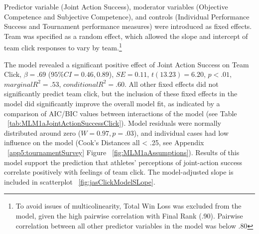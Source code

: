 \bigskip

Predictor variable (Joint Action Success), moderator variables (Objective Competence and Subjective Competence), and controls (Individual Performance Success and Tournament performance measures) were introduced as fixed effects.   Team was specified as a random effect, which allowed the slope and intercept of team click responses to vary by team.\footnote{To avoid issues of multicolinearity, Total Win Loss was excluded from the model, given the high pairwise correlation with Final Rank (.90). Pairwise correlation between all other predictor variables in the model was below .80}

The model revealed a significant positive effect of Joint Action Success on Team Click, $\beta = .69$ ($95\% CI =  0.46, 0.89$), $SE = 0.11$, $t(13.23) = 6.20$, $p < .01$, $marginal R^2 = .53$, $conditional R^2 = .60$. All other fixed effects did not significantly predict team click, but the inclusion of these fixed effects in the model did significantly improve the overall model fit, as indicated by a comparison of AIC/BIC values between interactions of the model (see Table ~\ref{tab:MLM1aJointActionSuccessClick}).  Model residuals were normally distributed around zero ($W = 0.97, p = .03$), and individual cases had low influence on the model (Cook's Distances all < .25, see Appendix ~\ref{app5:tournamentSurvey} Figure ~\ref{fig:MLM1aAssumptions}). Results of this model support the prediction that athletes' perceptions of joint-action success correlate positively with feelings of team click.  The model-adjusted slope is included in scatterplot ~\ref{fig:jasClickModelSLope}.





